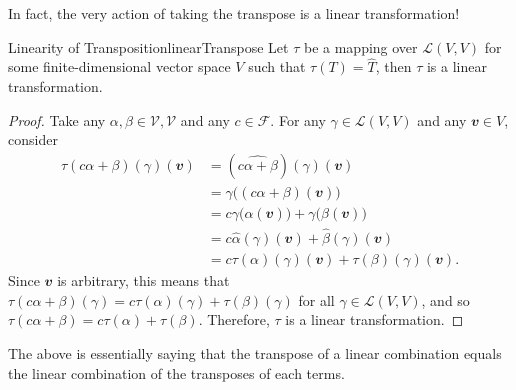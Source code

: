 \documentclass[math, code]{amznotes}
\theoremstyle{remark}
\begin{document}
In fact, the very action of taking the transpose is a linear transformation!
\begin{probox}{Linearity of Transposition}{linearTranspose}
    Let $\tau$ be a mapping over $\mathcal{L}(V, V)$ for some finite-dimensional vector space $V$ such that $\tau(T) = \hat{T}$, then $\tau$ is a linear transformation.
    \tcblower
    \begin{proof}
        Take any $\alpha, \beta \in \mathcal{V, V}$ and any $c \in \mathcal{F}$. For any $\gamma \in \mathcal{L}(V, V)$ and any $\mathbfit{v} \in V$, consider 
        \begin{align*}
            \tau(c\alpha + \beta)(\gamma)(\mathbfit{v}) & = \left(\widehat{c\alpha + \beta}\right)(\gamma)(\mathbfit{v}) \\
            & = \gamma\bigl((c\alpha + \beta)(\mathbfit{v})\bigr) \\
            & = c\gamma\bigl(\alpha(\mathbfit{v})\bigr) + \gamma\bigl(\beta(\mathbfit{v})\bigr) \\
            & = c\hat{\alpha}(\gamma)(\mathbfit{v}) + \hat{\beta}(\gamma)(\mathbfit{v}) \\
            & = c\tau(\alpha)(\gamma)(\mathbfit{v}) + \tau(\beta)(\gamma)(\mathbfit{v}).
        \end{align*}
        Since $\mathbfit{v}$ is arbitrary, this means that $\tau(c\alpha + \beta)(\gamma) = c\tau(\alpha)(\gamma) + \tau(\beta)(\gamma)$ for all $\gamma \in \mathcal{L}(V, V)$, and so $\tau(c\alpha + \beta) = c\tau(\alpha) + \tau(\beta)$. Therefore, $\tau$ is a linear transformation.
    \end{proof}
\end{probox}
The above is essentially saying that the transpose of a linear combination equals the linear combination of the transposes of each terms.
\end{document}
